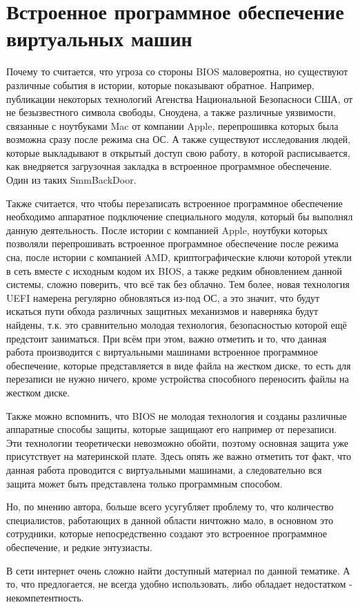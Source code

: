 \section{Встроенное программное обеспечение виртуальных машин}
Почему то считается,
	что угроза со стороны BIOS маловероятна,
	но существуют различные события в истории,
		которые показывают обратное.
Например, публикации некоторых технологий Агенства Национальной Безопасноси США, от не безызвестного символа свободы, Сноудена, а также различные уязвимости, связанные с ноутбуками Mac от компании Apple, перепрошивка которых была возможна сразу после режима сна ОС\cite{Apple:Sleep}.
А также существуют исследования людей, которые выкладывают в открытый доступ свою работу, в которой расписывается, как внедряется загрузочная закладка в встроенное программное обеспечение. Один из таких SmmBackDoor\cite{SmmBackDoor}.

Также считается, что чтобы перезаписать встроенное программное обеспечение необходимо аппаратное подключение специального модуля, который бы выполнял данную деятельность.
После истории с компанией Apple, ноутбуки которых позволяли перепрошивать встроенное программное обеспечение после режима сна, после истории с компанией AMD, криптографические ключи которой утекли в сеть вместе с исходным кодом их BIOS, а также редким обновлением данной системы, сложно поверить, что всё так без облачно.
Тем более, новая технология UEFI намерена регулярно обновляться из-под ОС, а это значит, что будут искаться пути обхода различных защитных механизмов и наверняка будут найдены, т.к. это сравнительно молодая технология, безопасностью которой ещё предстоит заниматься.
При всём при этом, важно отметить и то, что данная работа производится с виртуальными машинами встроенное программное обеспечение, которые представляется в виде файла на жестком диске, то есть для перезаписи не нужно ничего, кроме устройства способного переносить файлы на жестком диске.

Также можно вспомнить, что BIOS не молодая технология и созданы различные аппаратные способы защиты, которые защищают его например от перезаписи.
Эти технологии теоретически невозможно обойти, поэтому основная защита уже присутствует на материнской плате.
Здесь опять же важно отметить тот факт, что данная работа проводится с виртуальными машинами, а следовательно вся защита может быть представлена только программным способом.

Но, по мнению автора, больше всего усугубляет проблему то,
	что количество специалистов,
		работающих в данной области ничтожно мало,
	в основном это сотрудники,
		которые непосредственно создают это встроенное программное обеспечение, и редкие энтузиасты.

В сети интернет очень сложно найти доступный материал по данной тематике.
А то, что предлогается, не всегда удобно использовать, либо обладает недостатком - некомпетентность.
